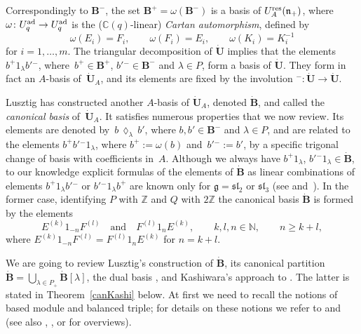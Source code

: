 \documentclass[pdftex]{sigma}
\numberwithin{equation}{section}
\theoremstyle{definition}
\newcommand{\mc}{\mathbb{C}}
\newcommand{\mz}{\mathbb{Z}}
\newcommand{\mn}{\mathbb{N}}
\newcommand{\ra}{\rightarrow}
\begin{document}
Correspondingly to $\mathbf{B}^-$, the set $\mathbf{B}^+ = \omega(\mathbf{B}^-)$ is a basis of $U_A^{\rm res}(\mathfrak{n}_+)$, where $\omega\colon U_q^{\rm ad} \ra U_q^{\rm ad}$ is the ($\mc(q)$-linear) {\it Cartan automorphism}, defined by
\[\omega(E_i)=F_i , \qquad \omega(F_i) = E_i , \qquad \omega(K_i)=K_i^{-1}\]
for $i=1,\dots,m$. The triangular decomposition of $\dot{\mathbf{U}}$ implies that the elements $b^+1_\lambda b'{}^-$, where~${b^+ \in \mathbf{B}^+}$, $b'{}^- \in \mathbf{B}^-$ and $\lambda\in P$, form a basis of $\dot{\mathbf{U}}$. They form in fact an $A$-basis of~$\dot{\mathbf{U}}_A$, and its elements are fixed by the involution ${}^-\colon \dot{\mathbf{U}} {}\ra{} \dot{\mathbf{U}}$.

Lusztig has constructed another $A$-basis of $\dot{\mathbf{U}}_A$, denoted $\dot{\mathbf{B}}$, and called the {\it canonical basis} of~$\dot{\mathbf{U}}_A$. It satisfies numerous properties that we now review. Its elements are denoted by~${b\,\lozenge_\lambda\, b'}$, where $b, b' \in \mathbf{B}^-$ and $\lambda\in P$, and are related to the elements $b^+b'{}^-1_\lambda$, where $b^+ := \omega(b)$ and~${b'{}^-:=b'}$, by a specific trigonal change of basis with coefficients in~$A$. Although we always have $b^+1_\lambda$, $b'{}^-1_\lambda \in \dot{\mathbf{B}}$, to our knowledge explicit formulas of the elements of $\dot{\mathbf{B}}$ as linear combinations of elements $b^+1_\lambda b'{}^-$ or $b'{}^- 1_\lambda b^+$ are known only for $\mathfrak{g}={\mathfrak{sl}_2}$ or $\mathfrak{sl}_3$ (see \cite[Section~25.3]{Lusztig} and~\cite{Cui}). In the former case, identifying $P$ with $\mz$ and $Q$ with $2\mz$ the canonical basis $\dot{\mathbf{B}}$ is formed by the elements
\[%
E^{(k)}1_{-n}F^{(l)}\quad \text{and}\quad F^{(l)}1_nE^{(k)}, \qquad k,l,n\in \mn,\qquad n\geq k+l,
\]
where $E^{(k)}1_{-n}F^{(l)} = F^{(l)}1_nE^{(k)}$ for $n=k+l$.

We are going to review Lusztig's construction of $\dot{\mathbf{B}}$, its canonical partition $\dot{\mathbf{B}} = \bigcup_{\lambda\in P_+} \dot{\mathbf{B}} [\lambda]$, the dual basis , and Kashiwara's approach to  \cite{Kashiwara2,Kashiwara3}. The latter is stated in Theorem~\ref{canKashi} below. At first we need to recall the notions of based module and balanced triple; for details on these notions we refer to \cite[Chapter~27]{Lusztig} and \cite{Kashiwara2} (see also \cite{Kashiwara4}, \cite[Sections~3.15 and~3.16]{VY}, or \cite[Chapter~14]{CP} for overviews).
\end{document}

